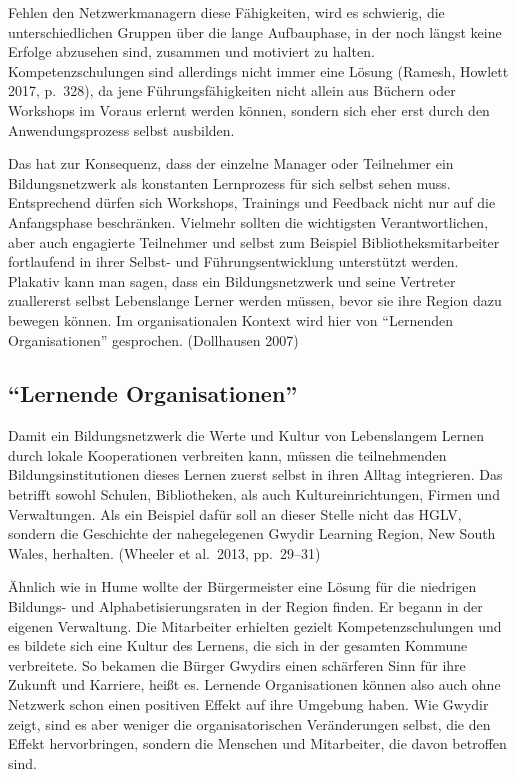 \documentclass[a4paper,
fontsize=11pt,
oneside,
numbers=noperiodatend,
parskip=half-,
bibliography=totoc,
final
]{scrartcl}
\begin{document}
Fehlen den Netzwerkmanagern diese Fähigkeiten, wird es schwierig, die
unterschiedlichen Gruppen über die lange Aufbauphase, in der noch längst
keine Erfolge abzusehen sind, zusammen und motiviert zu halten.
Kompetenzschulungen sind allerdings nicht immer eine Lösung (Ramesh,
Howlett 2017, p.~328), da jene Führungsfähigkeiten nicht allein aus
Büchern oder Workshops im Voraus erlernt werden können, sondern sich
eher erst durch den Anwendungsprozess selbst ausbilden.

Das hat zur Konsequenz, dass der einzelne Manager oder Teilnehmer ein
Bildungsnetzwerk als konstanten Lernprozess für sich selbst sehen muss.
Entsprechend dürfen sich Workshops, Trainings und Feedback nicht nur auf
die Anfangsphase beschränken. Vielmehr sollten die wichtigsten
Verantwortlichen, aber auch engagierte Teilnehmer und selbst zum
Beispiel Bibliotheksmitarbeiter fortlaufend in ihrer Selbst- und
Führungsentwicklung unterstützt werden. Plakativ kann man sagen, dass
ein Bildungsnetzwerk und seine Vertreter zuallererst selbst Lebenslange
Lerner werden müssen, bevor sie ihre Region dazu bewegen können. Im
organisationalen Kontext wird hier von \enquote{Lernenden
Organisationen} gesprochen. (Dollhausen 2007)

\hypertarget{lernende-organisationen}{%
\subsection*{\texorpdfstring{\enquote{Lernende
Organisationen}}{``Lernende Organisationen''}}\label{lernende-organisationen}}

Damit ein Bildungsnetzwerk die Werte und Kultur von Lebenslangem Lernen
durch lokale Kooperationen verbreiten kann, müssen die teilnehmenden
Bildungsinstitutionen dieses Lernen zuerst selbst in ihren Alltag
integrieren. Das betrifft sowohl Schulen, Bibliotheken, als auch
Kultureinrichtungen, Firmen und Verwaltungen. Als ein Beispiel dafür
soll an dieser Stelle nicht das HGLV, sondern die Geschichte der
nahegelegenen Gwydir Learning Region, New South Wales, herhalten.
(Wheeler et al.~2013, pp.~29--31)

Ähnlich wie in Hume wollte der Bürgermeister eine Lösung für die
niedrigen Bildungs- und Alphabetisierungsraten in der Region finden. Er
begann in der eigenen Verwaltung. Die Mitarbeiter erhielten gezielt
Kompetenzschulungen und es bildete sich eine Kultur des Lernens, die
sich in der gesamten Kommune verbreitete. So bekamen die Bürger Gwydirs
einen schärferen Sinn für ihre Zukunft und Karriere, heißt es. Lernende
Organisationen können also auch ohne Netzwerk schon einen positiven
Effekt auf ihre Umgebung haben. Wie Gwydir zeigt, sind es aber weniger
die organisatorischen Veränderungen selbst, die den Effekt
hervorbringen, sondern die Menschen und Mitarbeiter, die davon betroffen
sind.
\end{document}
